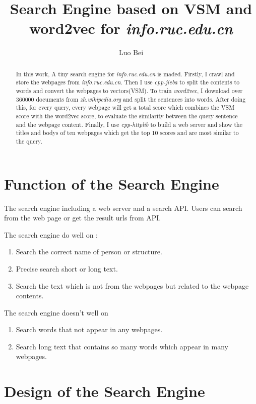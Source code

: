 \documentclass[a4paper]{article}
\title{Search Engine based on VSM and word2vec for \emph{info.ruc.edu.cn} }
\author{Luo Bei}
\begin{document}
\maketitle

\begin{abstract}
In this work, A tiny search engine for \emph{info.ruc.edu.cn} is maded. Firstly, I crawl and store the webpages from \emph{info.ruc.edu.cn}. Then I use \emph{cpp-jieba} to split the contents to words and convert the webpages to vectors(VSM). To train \emph{word2vec}, I download over 360000 documents from \emph{zh.wikipedia.org} and split the sentences into words. After doing this, for every query, every webpage will get a total score which combines the VSM score with the word2vec score, to evaluate the similarity between the query sentence and the webpage content. Finally, I use \emph{cpp-httplib} to build a web server and show the titles and bodys of ten webpages which get the top 10 scores and are most similar to the query.
\end{abstract}

\section{Function of the Search Engine}

The search engine including a web server and a search API. Users can search from the web page or get the result urls from API.

The search engine do well on :
\begin{enumerate}
\item Search the correct name of person or structure.
\item Precise search short or long text.
\item Search the text which is not from the webpages but related to the webpage contents.
\end{enumerate}

The search engine doesn't well on 

\begin{enumerate}
\item Search words that not appear in any webpages.
\item Search long text that contains so many words which appear in many webpages.
\end{enumerate}

\section{Design of the Search Engine}
\end{document}
